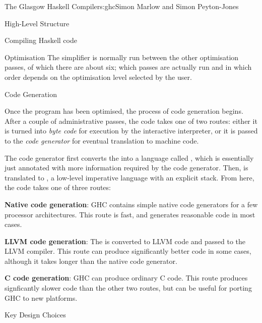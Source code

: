 \begin{aosachapter}{The Glasgow Haskell Compiler}{s:ghc}{Simon Marlow and Simon Peyton-Jones}
\begin{aosasect1}{High-Level Structure}
\begin{aosasect2}{Compiling Haskell code}
\begin{aosasect3}{Optimisation}
The simplifier is normally run between the other optimisation passes,
of which there are about six; which passes are actually run and in
which order depends on the optimisation level selected by the user.

\end{aosasect3}

\begin{aosasect3}{Code Generation}

Once the  program has been optimised, the process of code
generation begins.  After a couple of administrative passes, the code
takes one of two routes: either it is turned into \emph{byte code} for
execution by the interactive interpreter, or it is passed to the
\emph{code generator} for eventual translation to machine code.

The code generator first converts the  into a language
called , which is essentially just  annotated
with more information required by the code generator.  Then,
 is translated to , a low-level imperative
language with an explicit stack. From here, the code takes one of
three routes:

\begin{aosaitemize}

\item \textbf{Native code generation}: GHC contains simple native code
  generators for a few processor architectures.  This route is fast,
  and generates reasonable code in most cases.

\item \textbf{LLVM code generation}: The  is converted to
  LLVM code and passed to the LLVM compiler.  This route can produce
  significantly better code in some cases, although it takes longer
  than the native code generator.

\item \textbf{C code generation}: GHC can produce ordinary C code.
  This route produces signficantly slower code than the other two
  routes, but can be useful for porting GHC to new platforms.

\end{aosaitemize}

\end{aosasect3}

\end{aosasect2}

\end{aosasect1}

\begin{aosasect1}{Key Design Choices}


\end{aosasect1}
\end{aosachapter}
